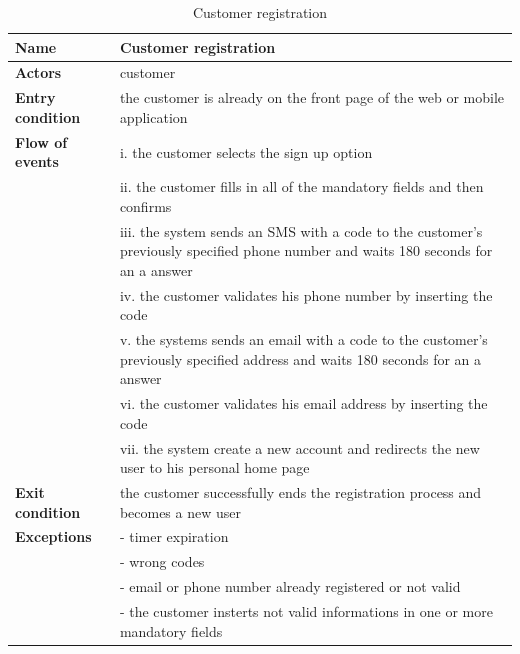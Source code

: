 \begin{table}[h!]
    \centering
    \begin{tabular}{@{}P{0.2\textwidth}P{0.70\textwidth}@{}}
        \toprule
        \textbf{Name}                 & Customer registration\\
        \midrule
        \textbf{Actors}               & customer\\
        \textbf{Entry condition}      & the customer is already on the front page of the web or mobile application\\
        \textbf{Flow of events} 
        & i. the customer selects the sign up option\\
        & ii. the customer fills in all of the mandatory fields and then confirms\\
        & iii. the system sends an SMS with a code to the customer's previously specified phone number and waits 180 seconds for an a answer\\
        & iv. the customer validates his phone number by inserting the code\\
        & v. the systems sends an email with a code to the customer's previously specified address and waits 180 seconds for an a answer\\
        & vi. the customer validates his email address by inserting the code\\
        & vii. the system create a new account and redirects the new user to his personal home page\\
        \textbf{Exit condition}       & the customer successfully ends the registration process and becomes a new user\\
        \textbf{Exceptions}           
        & - timer expiration\\
        & - wrong codes\\
        & - email or phone number already registered or not valid\\
        & - the customer insterts not valid informations in one or more mandatory fields\\
        \bottomrule
    \end{tabular}
\caption{Customer registration}
\label{table:customerregitration}
\end{table}

